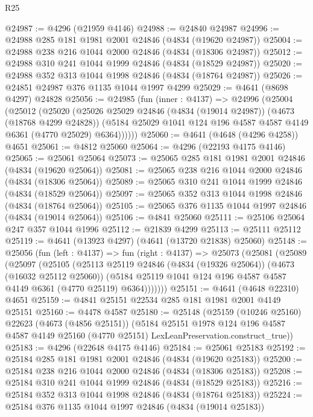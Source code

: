 \begin{lexlean}{R25}
\begin{coremodule}
@24987 := @4296 (@21959 @4146)
@24988 := @24840 @24987
@24996 := @24988 @285 @181 @1981 @2001 @24846 (@4834 (@19620 @24987))
@25004 := @24988 @238 @216 @1044 @2000 @24846 (@4834 (@18306 @24987))
@25012 := @24988 @310 @241 @1044 @1999 @24846 (@4834 (@18529 @24987))
@25020 := @24988 @352 @313 @1044 @1998 @24846 (@4834 (@18764 @24987))
@25026 := @24851 @24987 @376 @1135 @1044 @1997 @4299
@25029 := @4641 (@8698 @4297) @24828
@25056 := @24985
    (fun (inner : @4137) =>
    @24996
      (@25004
        (@25012
          (@25020
            (@25026
              @25029
              @24846
              (@4834 (@19014 @24987))
              (@4673 (@18768 @4299 @24828))
              (@5184 @25029 @1041 @124 @196 @4587 @4587 @4149 @6361 (@4770 @25029) @6364))))))
@25060 := @4641 (@4648 (@4296 @4258)) @4651
@25061 := @4812 @25060
@25064 := @4296 (@22193 @4175 @4146)
@25065 := @25061 @25064
@25073 := @25065 @285 @181 @1981 @2001 @24846 (@4834 (@19620 @25064))
@25081 := @25065 @238 @216 @1044 @2000 @24846 (@4834 (@18306 @25064))
@25089 := @25065 @310 @241 @1044 @1999 @24846 (@4834 (@18529 @25064))
@25097 := @25065 @352 @313 @1044 @1998 @24846 (@4834 (@18764 @25064))
@25105 := @25065 @376 @1135 @1044 @1997 @24846 (@4834 (@19014 @25064))
@25106 := @4841 @25060
@25111 := @25106 @25064 @247 @357 @1044 @1996
@25112 := @21839 @4299
@25113 := @25111 @25112
@25119 := @4641 (@13923 @4297) (@4641 (@13720 @21838) @25060)
@25148 := @25056
    (fun (left : @4137) =>
    fun (right : @4137) =>
    @25073
      (@25081
        (@25089
          (@25097
            (@25105
              (@25113
                @25119
                @24846
                (@4834 (@19326 @25064))
                (@4673 (@16032 @25112 @25060))
                (@5184 @25119 @1041 @124 @196 @4587 @4587 @4149 @6361 (@4770 @25119) @6364)))))))
@25151 := @4641 (@4648 @22310) @4651
@25159 := @4841 @25151 @22534 @285 @181 @1981 @2001 @4149 @25151
@25160 := @4478 @4587
@25180 := @25148
    (@25159
      (@10246 @25160)
      @22623
      (@4673 (@4856 @25151))
      (@5184
        @25151
        @1978
        @124
        @196
        @4587
        @4587
        @4149
        @25160
        (@4770 @25151)
        LexLeanPreservation.construct_true))
@25183 := @4296 (@22648 @4175 @4146)
@25184 := @25061 @25183
@25192 := @25184 @285 @181 @1981 @2001 @24846 (@4834 (@19620 @25183))
@25200 := @25184 @238 @216 @1044 @2000 @24846 (@4834 (@18306 @25183))
@25208 := @25184 @310 @241 @1044 @1999 @24846 (@4834 (@18529 @25183))
@25216 := @25184 @352 @313 @1044 @1998 @24846 (@4834 (@18764 @25183))
@25224 := @25184 @376 @1135 @1044 @1997 @24846 (@4834 (@19014 @25183))

\end{coremodule}
\end{lexlean}
